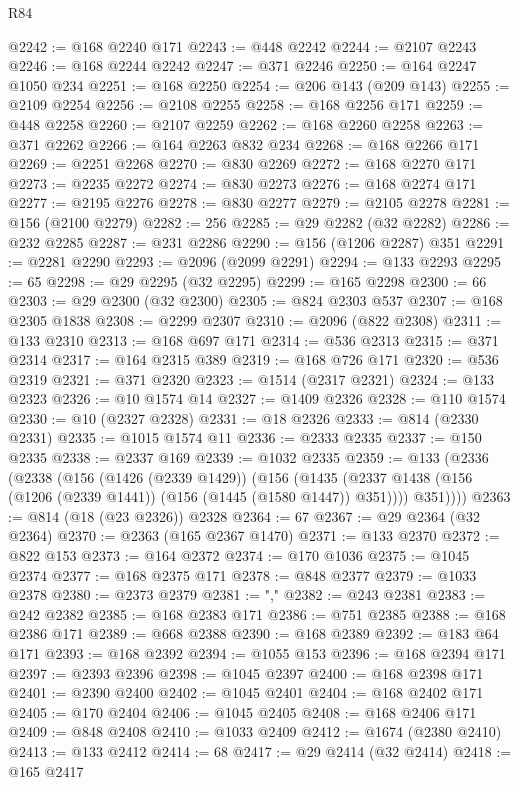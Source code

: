 \begin{lexlean}{R84}
\begin{coremodule}
@2242 := @168 @2240 @171
@2243 := @448 @2242
@2244 := @2107 @2243
@2246 := @168 @2244 @2242
@2247 := @371 @2246
@2250 := @164 @2247 @1050 @234
@2251 := @168 @2250
@2254 := @206 @143 (@209 @143)
@2255 := @2109 @2254
@2256 := @2108 @2255
@2258 := @168 @2256 @171
@2259 := @448 @2258
@2260 := @2107 @2259
@2262 := @168 @2260 @2258
@2263 := @371 @2262
@2266 := @164 @2263 @832 @234
@2268 := @168 @2266 @171
@2269 := @2251 @2268
@2270 := @830 @2269
@2272 := @168 @2270 @171
@2273 := @2235 @2272
@2274 := @830 @2273
@2276 := @168 @2274 @171
@2277 := @2195 @2276
@2278 := @830 @2277
@2279 := @2105 @2278
@2281 := @156 (@2100 @2279)
@2282 := 256
@2285 := @29 @2282 (@32 @2282)
@2286 := @232 @2285
@2287 := @231 @2286
@2290 := @156 (@1206 @2287) @351
@2291 := @2281 @2290
@2293 := @2096 (@2099 @2291)
@2294 := @133 @2293
@2295 := 65
@2298 := @29 @2295 (@32 @2295)
@2299 := @165 @2298
@2300 := 66
@2303 := @29 @2300 (@32 @2300)
@2305 := @824 @2303 @537
@2307 := @168 @2305 @1838
@2308 := @2299 @2307
@2310 := @2096 (@822 @2308)
@2311 := @133 @2310
@2313 := @168 @697 @171
@2314 := @536 @2313
@2315 := @371 @2314
@2317 := @164 @2315 @389
@2319 := @168 @726 @171
@2320 := @536 @2319
@2321 := @371 @2320
@2323 := @1514 (@2317 @2321)
@2324 := @133 @2323
@2326 := @10 @1574 @14
@2327 := @1409 @2326
@2328 := @110 @1574
@2330 := @10 (@2327 @2328)
@2331 := @18 @2326
@2333 := @814 (@2330 @2331)
@2335 := @1015 @1574 @11
@2336 := @2333 @2335
@2337 := @150 @2335
@2338 := @2337 @169
@2339 := @1032 @2335
@2359 := @133
    (@2336
      (@2338
        (@156
          (@1426 (@2339 @1429))
          (@156
            (@1435 (@2337 @1438 (@156 (@1206 (@2339 @1441)) (@156 (@1445 (@1580 @1447)) @351))))
            @351))))
@2363 := @814 (@18 (@23 @2326)) @2328
@2364 := 67
@2367 := @29 @2364 (@32 @2364)
@2370 := @2363 (@165 @2367 @1470)
@2371 := @133 @2370
@2372 := @822 @153
@2373 := @164 @2372
@2374 := @170 @1036
@2375 := @1045 @2374
@2377 := @168 @2375 @171
@2378 := @848 @2377
@2379 := @1033 @2378
@2380 := @2373 @2379
@2381 := ","
@2382 := @243 @2381
@2383 := @242 @2382
@2385 := @168 @2383 @171
@2386 := @751 @2385
@2388 := @168 @2386 @171
@2389 := @668 @2388
@2390 := @168 @2389
@2392 := @183 @64 @171
@2393 := @168 @2392
@2394 := @1055 @153
@2396 := @168 @2394 @171
@2397 := @2393 @2396
@2398 := @1045 @2397
@2400 := @168 @2398 @171
@2401 := @2390 @2400
@2402 := @1045 @2401
@2404 := @168 @2402 @171
@2405 := @170 @2404
@2406 := @1045 @2405
@2408 := @168 @2406 @171
@2409 := @848 @2408
@2410 := @1033 @2409
@2412 := @1674 (@2380 @2410)
@2413 := @133 @2412
@2414 := 68
@2417 := @29 @2414 (@32 @2414)
@2418 := @165 @2417

\end{coremodule}
\end{lexlean}
